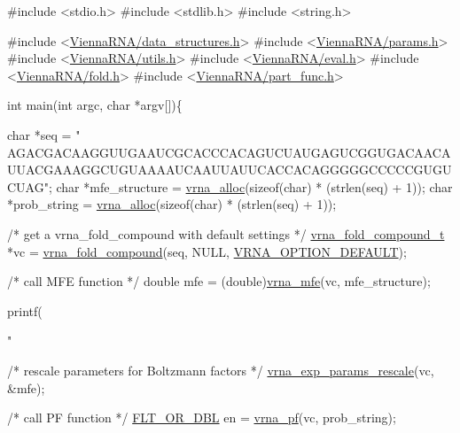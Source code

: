 \begin{DoxyCodeInclude}
\textcolor{preprocessor}{#include <stdio.h>}
\textcolor{preprocessor}{#include <stdlib.h>}
\textcolor{preprocessor}{#include <string.h>}

\textcolor{preprocessor}{#include  <\hyperlink{data__structures_8h}{ViennaRNA/data\_structures.h}>}
\textcolor{preprocessor}{#include  <\hyperlink{params_8h}{ViennaRNA/params.h}>}
\textcolor{preprocessor}{#include  <\hyperlink{utils_8h}{ViennaRNA/utils.h}>}
\textcolor{preprocessor}{#include  <\hyperlink{eval_8h}{ViennaRNA/eval.h}>}
\textcolor{preprocessor}{#include  <\hyperlink{fold_8h}{ViennaRNA/fold.h}>}
\textcolor{preprocessor}{#include  <\hyperlink{part__func_8h}{ViennaRNA/part\_func.h}>}


\textcolor{keywordtype}{int} main(\textcolor{keywordtype}{int} argc, \textcolor{keywordtype}{char} *argv[])\{

  \textcolor{keywordtype}{char}  *seq = \textcolor{stringliteral}{"
      AGACGACAAGGUUGAAUCGCACCCACAGUCUAUGAGUCGGUGACAACAUUACGAAAGGCUGUAAAAUCAAUUAUUCACCACAGGGGGCCCCCGUGUCUAG"};
  \textcolor{keywordtype}{char}  *mfe\_structure = \hyperlink{group__utils_gaf37a0979367c977edfb9da6614eebe99}{vrna\_alloc}(\textcolor{keyword}{sizeof}(\textcolor{keywordtype}{char}) * (strlen(seq) + 1));
  \textcolor{keywordtype}{char}  *prob\_string   = \hyperlink{group__utils_gaf37a0979367c977edfb9da6614eebe99}{vrna\_alloc}(\textcolor{keyword}{sizeof}(\textcolor{keywordtype}{char}) * (strlen(seq) + 1));

  \textcolor{comment}{/* get a vrna\_fold\_compound with default settings */}
  \hyperlink{group__fold__compound_structvrna__fc__s}{vrna\_fold\_compound\_t} *vc = \hyperlink{group__fold__compound_ga6601d994ba32b11511b36f68b08403be}{vrna\_fold\_compound}(seq, NULL, 
      \hyperlink{group__fold__compound_gacea5b7ee6181c485f36e2afa0e9089e4}{VRNA\_OPTION\_DEFAULT});

  \textcolor{comment}{/* call MFE function */}
  \textcolor{keywordtype}{double} mfe = (double)\hyperlink{group__mfe__fold_gabd3b147371ccf25c577f88bbbaf159fd}{vrna\_mfe}(vc, mfe\_structure);

  printf(\textcolor{stringliteral}{"%

  \textcolor{comment}{/* rescale parameters for Boltzmann factors */}
  \hyperlink{group__energy__parameters_gad607bc3a5b5da16400e2ca4ea5560233}{vrna\_exp\_params\_rescale}(vc, &mfe);

  \textcolor{comment}{/* call PF function */}
  \hyperlink{group__data__structures_ga31125aeace516926bf7f251f759b6126}{FLT\_OR\_DBL} en = \hyperlink{group__pf__fold_ga29e256d688ad221b78d37f427e0e99bc}{vrna\_pf}(vc, prob\_string);

}
\end{DoxyCodeInclude}
